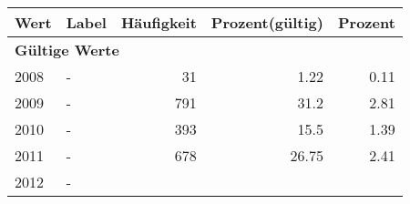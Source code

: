      \begin{longtable}{lXrrr}
     \toprule
     \textbf{Wert} & \textbf{Label} & \textbf{Häufigkeit} & \textbf{Prozent(gültig)} & \textbf{Prozent} \\
     \endhead
     \midrule
     \multicolumn{5}{l}{\textbf{Gültige Werte}}\\

     2008 &
     \multicolumn{1}{X}{ -  } &


       \num{31} &
       \num[round-mode=places,round-precision=2]{1.22} &
         \num[round-mode=places,round-precision=2]{0.11} \\

     2009 &
     \multicolumn{1}{X}{ -  } &


       \num{791} &
       \num[round-mode=places,round-precision=2]{31.2} &
         \num[round-mode=places,round-precision=2]{2.81} \\

     2010 &
     \multicolumn{1}{X}{ -  } &


       \num{393} &
       \num[round-mode=places,round-precision=2]{15.5} &
         \num[round-mode=places,round-precision=2]{1.39} \\

     2011 &
     \multicolumn{1}{X}{ -  } &


       \num{678} &
       \num[round-mode=places,round-precision=2]{26.75} &
         \num[round-mode=places,round-precision=2]{2.41} \\

     2012 &
     \multicolumn{1}{X}{ -  } &



\end{longtable}
